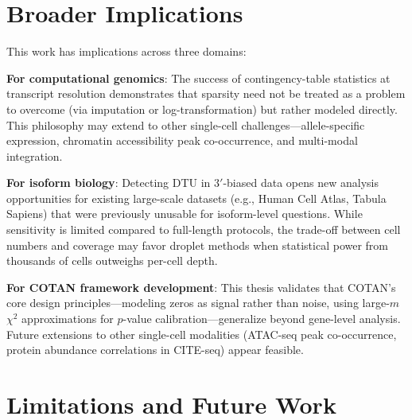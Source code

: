 \section{Broader Implications}

This work has implications across three domains:

\textbf{For computational genomics}: The success of contingency-table statistics at transcript resolution demonstrates that sparsity need not be treated as a problem to overcome (via imputation or log-transformation) but rather modeled directly. This philosophy may extend to other single-cell challenges---allele-specific expression, chromatin accessibility peak co-occurrence, and multi-modal integration.

\textbf{For isoform biology}: Detecting DTU in $3'$-biased data opens new analysis opportunities for existing large-scale datasets (e.g., Human Cell Atlas, Tabula Sapiens) that were previously unusable for isoform-level questions. While sensitivity is limited compared to full-length protocols, the trade-off between cell numbers and coverage may favor droplet methods when statistical power from thousands of cells outweighs per-cell depth.

\textbf{For COTAN framework development}: This thesis validates that COTAN's core design principles---modeling zeros as signal rather than noise, using large-$m$ $\chi^2$ approximations for $p$-value calibration---generalize beyond gene-level analysis. Future extensions to other single-cell modalities (ATAC-seq peak co-occurrence, protein abundance correlations in CITE-seq) appear feasible.

\section{Limitations and Future Work}

